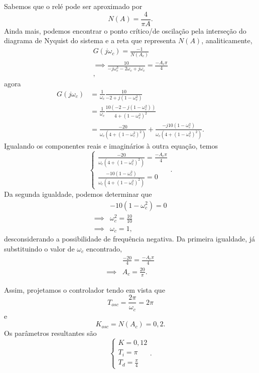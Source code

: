 \documentclass[a4paper]{report}
\begin{document}
Sabemos que o relé pode ser aproximado por  \[
    N(A) = \frac{4}{\pi A}
.\] Ainda mais, podemos encontrar o ponto crítico/de oscilação pela interseção do diagrama de Nyquist do sistema e a reta que representa $N(A)$, analiticamente,
\begin{align*}
    G(j\omega_c) = \frac{-1}{N(A_c)} \\
    \implies \frac{10}{-j\omega_c^3 -2\omega_c + j\omega_c} = \frac{-A_c\pi}{4} \\
,\end{align*}
agora
\begin{align*}
    G\left( j\omega_c \right)  &= \frac{1}{\omega_c}\frac{10}{-2 +j\left( 1-\omega_c^2 \right) } \\
			       &= \frac{1}{\omega_c} \frac{10\left( -2 -j\left( 1-\omega_c^2 \right)  \right) }{4 + \left( 1-\omega_c^2 \right) ^2} \\
			       &= \frac{-20}{\omega_c\left( 4 + \left( 1-\omega_c^2 \right) ^2 \right) } + \frac{-j10\left( 1-\omega_c^2 \right) }{\omega_c\left( 4 + \left( 1-\omega_c^2 \right) ^2 \right)}
.\end{align*}
Igualando os componentes reais e imaginários à outra equação, temos \[
\begin{cases}
    \frac{-20}{\omega_c\left( 4 + \left( 1-\omega_c^2 \right) ^2 \right) } = \frac{-A_c\pi}{4} \\
    \frac{-10\left( 1-\omega_c^2 \right) }{\omega_c\left( 4 + \left( 1-\omega_c^2 \right) ^2 \right)} = 0
\end{cases}
.\] Da segunda igualdade, podemos determinar que
\begin{align*}
    & -10\left( 1-\omega_c^2 \right) = 0 \\
    \implies& \omega_c^2 = \frac{10}{10} \\
    \implies& \omega_c = 1
,\end{align*}
desconsiderando a possibilidade de frequência negativa. Da primeira igualdade, já substituindo o valor de $\omega_c$ encontrado,
\begin{align*}
    & \frac{-20}{4} = \frac{-A_c\pi}{4} \\
    \implies& A_c = \frac{20}{\pi}
.\end{align*}

Assim, projetamos o controlador tendo em vista que \[
T_{osc} = \frac{2\pi}{\omega_c} = 2\pi
\] e \[
K_{osc} = N(A_c) = 0,2
.\] Os parâmetros resultantes são \[
\begin{cases}
    K = 0,12 \\
    T_i = \pi \\
    T_d = \frac{\pi}{4}
\end{cases}
.\] 
\end{document}
